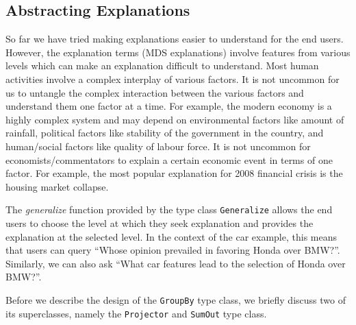\documentclass{jfp}
\newcommand{\prog}[1]{\texttt{#1}}
\begin{document}
\subsection{Abstracting Explanations}
So far we have tried making explanations easier to understand for the end users. However, the explanation terms (MDS explanations) involve features from various levels which can make an explanation difficult to understand. Most human activities involve a complex interplay of various factors. It is not uncommon for us to untangle the complex interaction between the various factors and understand them one factor at a time. For example, the modern economy is a highly complex system and may depend on environmental factors like amount of rainfall, political factors like stability of the government in the country, and human/social factors like quality of labour force. It is not uncommon for economists/commentators to explain a certain economic event in terms of one factor. For example, the most popular explanation for 2008 financial crisis is the housing market collapse. 

The \emph{generalize} function provided by the type class \prog{Generalize} allows the end users to choose the level at which they seek explanation and provides the explanation at the selected level. In the context of the car example, this means that users can query ``Whose opinion prevailed in favoring Honda over BMW?''. Similarly, we can also ask ``What car features lead to the selection of Honda over BMW?''. 


Before we describe the design of the \prog{GroupBy} type class, we briefly discuss two of its superclasses, namely the \prog{Projector} and \prog{SumOut} type class. 
\end{document}
